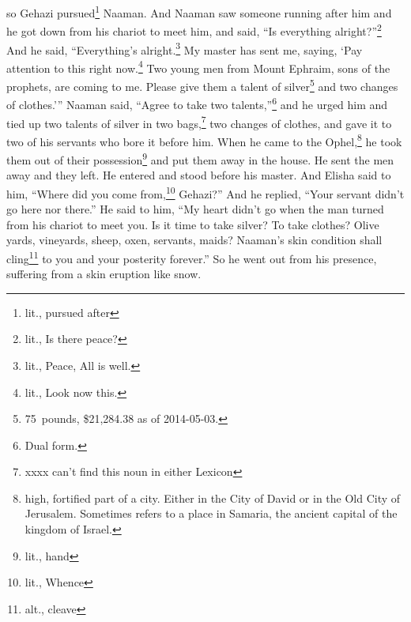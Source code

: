 \begin{inparaenum}
     so Gehazi pursued\footnote{lit., pursued after} Naaman. And Naaman saw someone running after him and he got down from his chariot to meet him, and said, ``Is everything alright?''\footnote{lit., Is there peace?}%
     And he said, ``Everything's alright.\footnote{lit., Peace, All is well.} My master has sent me, saying, `Pay attention to this right now.\footnote{lit., Look now this.} Two young men from Mount Ephraim, sons of the prophets, are coming to me. Please give them a talent of silver\footnote{75~pounds, \$21,284.38 as of 2014-05-03.} and two changes of clothes.'\thinspace''%
     Naaman said, ``Agree to take two talents,''\footnote{Dual form.} and he urged him and tied up two talents of silver in two bags,\footnote{xxxx can't find this noun in either Lexicon} two changes of clothes, and gave it to two of his servants who bore it before him.%
     When he came to the Ophel,\footnote{high, fortified part of a city. Either in the City of David or in the Old City of Jerusalem. Sometimes refers to a place in Samaria, the ancient capital of the kingdom of Israel.} he took them out of their possession\footnote{lit., hand} and put them away in the house. He sent the men away and they left.%
     He entered and stood before his master. And Elisha said to him, ``Where did you come from,\footnote{lit., Whence} Gehazi?'' And he replied, ``Your servant didn't go here nor there.''%
     He said to him, ``My heart didn't go when the man turned from his chariot to meet you.  Is it time to take silver? To take clothes? Olive yards, vineyards, sheep, oxen, servants, maids?%
     Naaman's skin condition shall cling\footnote{alt., cleave} to you and your posterity forever.'' So he went out from his presence, suffering from a skin eruption like snow.%
\end{inparaenum}
